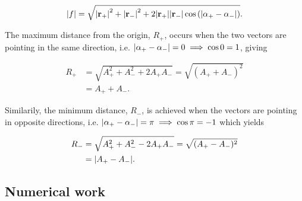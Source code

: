 \begin{equation}\label{eq:p3_magnitude_f}
    \abs{f} = \sqrt{\abs{\mathbf{r}_+}^2 + \abs{\mathbf{r}_-}^2 + 2\abs{\mathbf{r}_+}\abs{\mathbf{r_-}}\cos{(\abs{\alpha_+-\alpha_-})}}.
\end{equation}

The maximum distance from the origin, $R_+$, occurs when the two vectors are pointing in the same direction, i.e. $\abs{\alpha_+-\alpha_-} = 0 \implies \cos0=1$, giving 


\begin{align}
    R_+ &= \sqrt{A_+^2 + A_-^2 + 2A_+A_-} = \sqrt{(A_+ + A_-)^2}\nonumber \\
    &= A_+ + A_-. \label{eq:p4_Rplus}   
\end{align}

Similarily, the minimum distance, $R_-$, is achieved when the vectors are pointing in opposite directions, i.e. $\abs{\alpha_+-\alpha_-} = \pi \implies \cos\pi=-1$ which yields

 
\begin{align}
    R_- &= \sqrt{A_+^2 + A_-^2 - 2A_+A_-} = \sqrt{(A_+ - A_-)^2}\nonumber \\
    &= \abs{A_+ - A_-}. \label{eq:p4_Rminus}  
\end{align}











\subsection{ Numerical work}


